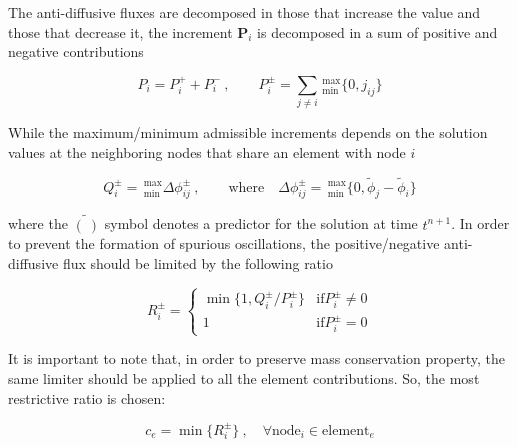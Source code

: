 The anti-diffusive fluxes are decomposed in those that increase the value and those that decrease it, the increment $\mathbf{P}_i$ is decomposed in a sum of positive and negative contributions

\begin{equation}
P_i = P_i^+ + P_i^- \ , \qquad
P_i^{\pm} = \sum_{j\neq i} \,
_{\min}^{\max} \{0, j_{ij}\}
\end{equation}

While the maximum/minimum admissible increments depends on the solution values at the neighboring nodes that share an element with node $i$

\begin{equation} \label{admissible_increment}
Q_i^\pm =\, _{\min}^{\max}\Delta \phi_{ij}^\pm \ , \qquad
\text{where} \quad \Delta \phi_{ij}^\pm =\, _{\min}^{\max}
\{0, \tilde{\phi}_j - \tilde{\phi}_i\}
\end{equation}

where the $\tilde{(\ )}$ symbol denotes a predictor for the solution at time $t^{n+1}$. In order to prevent the formation of spurious oscillations, the positive/negative anti-diffusive flux should be limited by the following ratio

\begin{equation}
R_i^\pm = \begin{cases}
    \min\{1, Q_i^\pm / P_i^\pm\} & \text{if} P_i^\pm \neq 0 \\
    1 & \text{if} P_i^\pm = 0
\end{cases}
\end{equation}

It is important to note that, in order to preserve mass conservation property, the same limiter should be applied to all the element contributions. So, the most restrictive ratio is chosen:

\begin{equation}
c_e = \min\{R_i^\pm\}\ , \quad \forall \text{node}_i \in \text{element}_e
\end{equation}



